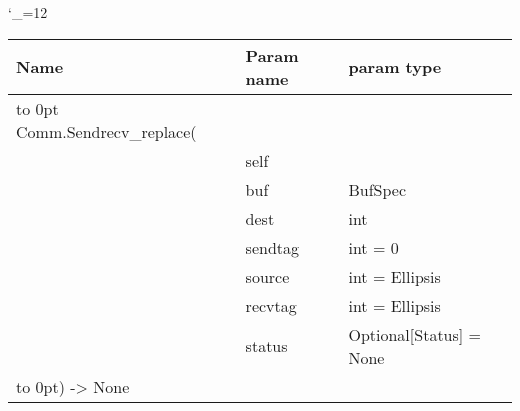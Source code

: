 \begingroup \catcode`\_=12 \tt
\begin{tabular}{lll}
\toprule
\textrm{Name}&\textrm{Param name}&\textrm{param type}\\
\midrule
\hbox to 0pt {Comm.Sendrecv_replace(\hss}\\
& self\\
& buf & BufSpec\\
& dest & int\\
& sendtag & int = 0\\
& source & int = Ellipsis\\
& recvtag & int = Ellipsis\\
& status & Optional[Status] = None\\
\hbox to 0pt{) -> None\hss}\\
\bottomrule
\end{tabular}
\endgroup
